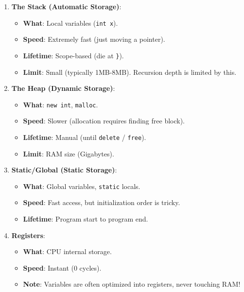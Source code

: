 \begin{enumerate}
\def\labelenumi{\arabic{enumi}.}
\tightlist
\item
  \textbf{The Stack (Automatic Storage)}:

  \begin{itemize}
  \tightlist
  \item
    \textbf{What}: Local variables (\passthrough{\lstinline!int x!}).
  \item
    \textbf{Speed}: Extremely fast (just moving a pointer).
  \item
    \textbf{Lifetime}: Scope-based (die at
    \passthrough{\lstinline!\}!}).
  \item
    \textbf{Limit}: Small (typically 1MB-8MB). Recursion depth is
    limited by this.
  \end{itemize}
\item
  \textbf{The Heap (Dynamic Storage)}:

  \begin{itemize}
  \tightlist
  \item
    \textbf{What}: \passthrough{\lstinline!new int!},
    \passthrough{\lstinline!malloc!}.
  \item
    \textbf{Speed}: Slower (allocation requires finding free block).
  \item
    \textbf{Lifetime}: Manual (until \passthrough{\lstinline!delete!} /
    \passthrough{\lstinline!free!}).
  \item
    \textbf{Limit}: RAM size (Gigabytes).
  \end{itemize}
\item
  \textbf{Static/Global (Static Storage)}:

  \begin{itemize}
  \tightlist
  \item
    \textbf{What}: Global variables, \passthrough{\lstinline!static!}
    locals.
  \item
    \textbf{Speed}: Fast access, but initialization order is tricky.
  \item
    \textbf{Lifetime}: Program start to program end.
  \end{itemize}
\item
  \textbf{Registers}:

  \begin{itemize}
  \tightlist
  \item
    \textbf{What}: CPU internal storage.
  \item
    \textbf{Speed}: Instant (0 cycles).
  \item
    \textbf{Note}: Variables are often optimized into registers, never
    touching RAM!
  \end{itemize}
\end{enumerate}

